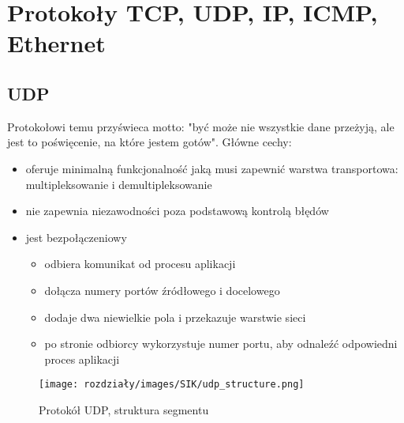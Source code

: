 \section{Protokoły TCP, UDP, IP, ICMP, Ethernet}

\subsection{UDP}
Protokołowi temu przyświeca motto: "być może nie wszystkie dane przeżyją, ale jest to poświęcenie, na które jestem gotów". Główne cechy:
\begin{itemize}
    \item oferuje minimalną funkcjonalność jaką musi zapewnić warstwa transportowa: multipleksowanie i demultipleksowanie
    \item nie zapewnia niezawodności poza podstawową kontrolą błędów
    \item jest bezpołączeniowy
    \begin{itemize}
        \item odbiera komunikat od procesu aplikacji
        \item dołącza numery portów źródłowego i docelowego
        \item dodaje dwa niewielkie pola i przekazuje warstwie sieci
        \item po stronie odbiorcy wykorzystuje numer portu, aby odnaleźć odpowiedni proces aplikacji
    \end{itemize}
\end{itemize}

\begin{figure}[H]
    \centering
    \texttt{[image: rozdziały/images/SIK/udp\_structure.png]}
    \caption{Protokół UDP, struktura segmentu}
\end{figure}


